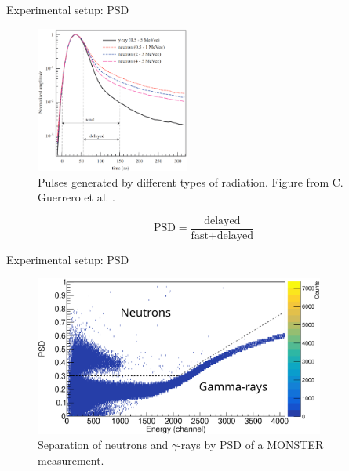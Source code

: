 \documentclass[11pt]{beamer}
\begin{document}
\begin{frame}{Experimental setup: PSD}
	\begin{figure}[H]
		\centering
		\includegraphics[width=0.45\textwidth]{psd_explanation.png}
		\caption{Pulses generated by different types of radiation. Figure from C. Guerrero et al. \cite{guerrero2008}.}
		\label{}
	\end{figure}
	\begin{equation}
		\text{PSD} = \frac{\text{delayed}}{\text{fast}+\text{delayed}}
	\end{equation}
\end{frame}

\begin{frame}{Experimental setup: PSD}
	\begin{figure}[H]
		\centering
		\includegraphics[width=0.85\textwidth]{example_psd.eps}
		\caption{Separation of neutrons and $\gamma$-rays by PSD of a MONSTER measurement.}
		\label{}
	\end{figure}
\end{frame}



\end{document}
